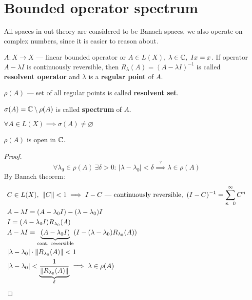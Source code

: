 \section{Bounded operator spectrum}
\noindent
All spaces in out theory are considered to be Banach spaces, we also operate on
complex numbers, since it is easier to reason about.

\begin{defn}
  $A\colon X \to X$ --- linear bounded operator or $A \in L(X)$,
  $\lambda \in \mathbb{C},\ Ix = x$.
  If operator $A - \lambda I$ is continuously reversible, then
  $R_\lambda(A) = (A - \lambda I)^{-1}$ is called \textbf{resolvent operator} and
  $\lambda$ is a \textbf{regular point} of $A$. 
\end{defn}

\begin{defn}
  $\rho(A)$ --- set of all regular
  points is called \textbf{resolvent set}. 
\end{defn}

\begin{defn}
  $\sigma(A) = \mathbb{C} \setminus \rho(A)$ is called \textbf{spectrum}
  of $A$.
\end{defn}

\begin{thm}
  $\forall A \in L(X) \implies \sigma(A) \neq \varnothing$
\end{thm}

\begin{thm}
  $\rho(A)$ is open in $\mathbb{C}$.
\end{thm}

\begin{proof}
  \[
    \forall \lambda_0 \in \rho(A)\ \exists \delta > 0:\ |\lambda - \lambda_0| <
    \delta \overset{?}{\implies} \lambda \in \rho(A)
  \]
  By Banach theorem:
  \begin{align*}
    &C \in L(X),\ \|C\| < 1 \implies I - C \text{ --- continuously reversible},\ (I -
      C)^{-1} = \sum_{n = 0}^\infty C^n\\
    &A - \lambda I = (A - \lambda_0 I) - (\lambda - \lambda_0) I \\
    &I = (A - \lambda_0 I)R_{\lambda_0}(A)\\
    &A -\lambda I = \underbrace{(A - \lambda_0 I)}_{\text{cont. reversible}}(I - (\lambda - \lambda_0)R_{\lambda_0}(A)) \\
    &|\lambda - \lambda_0| \cdot \|R_{\lambda_0}(A)\| < 1\\
    &|\lambda - \lambda_0| < \underbrace{\frac{1}{\|R_{\lambda_0}(A)\|}}_\delta \implies \lambda \in \rho(A) \qedhere
  \end{align*}
\end{proof}


